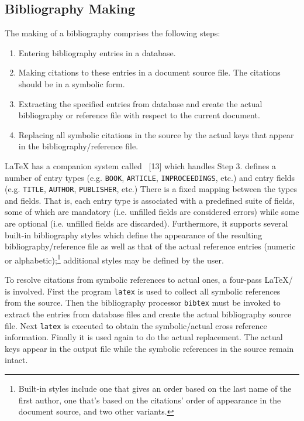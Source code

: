 \subsection{Bibliography Making}
The making of a bibliography comprises the following steps:
\begin{enumerate}
  \item Entering bibliography entries in a database.
  \item Making citations to these entries in a document
  	source file.  The citations should be in a symbolic form.
  \item Extracting the specified entries from database and create
  	the actual bibliography or reference file with respect to the
	current document.
  \item Replacing all symbolic citations in the source by the actual keys
  	that appear in the bibliography/reference file.
\end{enumerate}
{\LaTeX} has a companion system called
{\BibTeX}~[13] which handles Step 3.
{\BibTeX} defines a number of entry types (e.g. {\tt BOOK},
{\tt ARTICLE}, {\tt INPROCEEDINGS}, etc.) and entry fields (e.g. {\tt TITLE},
{\tt AUTHOR}, {\tt PUBLISHER}, etc.)  There is a fixed mapping between
the types and fields.  That is, each entry type is associated with a predefined
suite of fields, some of which are mandatory (i.e. unfilled fields are
considered errors) while some are optional (i.e. unfilled fields are
discarded).
Furthermore, it supports several built-in bibliography styles which define
the appearance of the resulting bibliography/reference file
as well as that of the actual reference entries
(numeric or alphabetic);\footnote{
Built-in styles include one that gives an order based on the last name
of the first author, one that's based on the citations' order of appearance
in the document source, and two other variants.}
additional styles may be defined by the user.

To resolve citations from symbolic references to actual ones,
a four-pass {\LaTeX}/{\BibTeX} is involved.  First the program \verb|latex|
is used to collect all symbolic references from the source.
Then the bibliography processor \verb|bibtex| must be invoked
to extract the entries from database files and create the actual bibliography
source file.
Next \verb|latex| is executed to obtain the symbolic/actual cross reference
information.  Finally it is used again to do the actual replacement.
The actual keys appear in the output file while
the symbolic references in the source remain intact.

